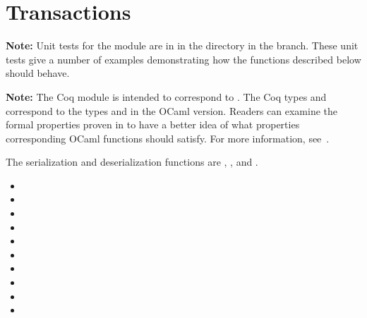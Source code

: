 \section{Transactions}


{\bf{Note:}} Unit tests for the {} module are in {}
in the {}
directory in the {} branch.
These unit tests give a number of examples demonstrating how the functions described below should behave.

{\bf{Note:}} The Coq module {} is intended to correspond to {}.
The Coq types {} and {} correspond to the types {} and {} in the OCaml version.
Readers can examine the formal properties proven in {} to have a better
idea of what properties corresponding OCaml functions should satisfy.
For more information, see~\cite{White2015b}.

{}
{}

The serialization and deserialization functions are
{},
{},
{}
and
{}.

\begin{itemize}
\item {}
\item {}
\item {}
\item {}
\item {}
\item {}
\item {}
\item {}
\item {}
\item {}
\end{itemize}

